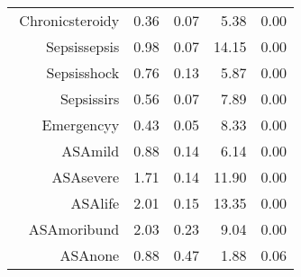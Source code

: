 \begin{tabular}{rrrrr}
$$  Chronic\-steroid\-y & 0.36 & 0.07 & 5.38 & 0.00 \\ 
  Sepsis\-sepsis & 0.98 & 0.07 & 14.15 & 0.00 \\ 
  Sepsis\-shock & 0.76 & 0.13 & 5.87 & 0.00 \\ 
  Sepsis\-sirs & 0.56 & 0.07 & 7.89 & 0.00 \\ 
  Emergency\-y & 0.43 & 0.05 & 8.33 & 0.00 \\ 
  ASA\-mild & 0.88 & 0.14 & 6.14 & 0.00 \\ 
  ASA\-severe & 1.71 & 0.14 & 11.90 & 0.00 \\ 
  ASA\-life & 2.01 & 0.15 & 13.35 & 0.00 \\ 
  ASA\-moribund & 2.03 & 0.23 & 9.04 & 0.00 \\ 
  ASA\-none & 0.88 & 0.47 & 1.88 & 0.06 \\ 
   \hline
\end{tabular}

